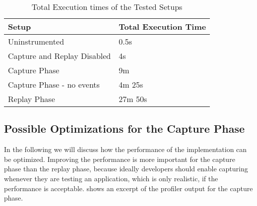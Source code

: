 \begin{center}
 \begin{table}
	\begin{tabular}[ht]{|l|l|} 
	\hline
	\textbf{Setup} & \textbf{Total Execution Time} \\ \hline
	Uninstrumented & 0.5s \\ \hline 
	Capture and Replay Disabled & 4s \\ \hline
	Capture Phase & 9m \\ \hline
	Capture Phase - no events & 4m 25s \\ \hline
	Replay Phase & 27m 50s \\ \hline
	\end{tabular}
 \caption{Total Execution times of the Tested Setups}
 \label{tbl:execution_times}
 \end{table} 
\end{center}

\subsection{Possible Optimizations for the Capture Phase}
In the following we will discuss how the performance of the implementation can be optimized. Improving the performance is more important for the capture phase than the replay phase, because ideally developers should enable capturing whenever they are testing an application, which is only realistic, if the performance is acceptable.  shows an excerpt of the profiler output for the capture phase.

